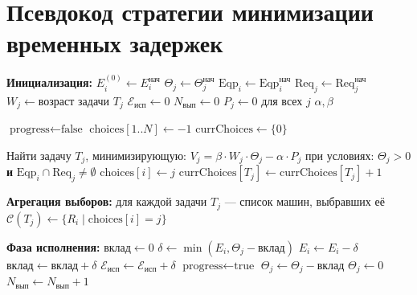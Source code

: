 \section{Псевдокод стратегии минимизации временных задержек}\label{app:pseudo_2}

\begin{breakablealgorithm}
	\label{pscode:z}
	\caption{Псевдокод стратегии $\Gamma_{\min\text{З}}$}
	\begin{algorithmic}[1]
		\State \textbf{Инициализация:}
		\State \quad $E_i^{(0)} \gets E_i^{\text{нач}}$ 
		\State \quad $\Theta_j \gets \Theta_j^{\text{нач}}$ 
		\State \quad $\text{Eqp}_i \gets \text{Eqp}_i^{\text{нач}}$ 
		\State \quad $\text{Req}_j \gets \text{Req}_j^{\text{нач}}$ 
		\State \quad $W_j \gets \text{возраст задачи } T_j$ 
		\State \quad $\mathcal{E}_{\text{исп}} \gets 0$ 
		\State \quad $N_{\text{вып}} \gets 0$ 
		\State \quad $P_j \gets 0$ для всех $j$ 
		\State \quad $\alpha, \beta$ 

		\State \quad $\text{progress} \gets \text{false}$
		\State \quad $\text{choices}[1..N] \gets -1$ 
		\State \quad $\text{currChoices} \gets \{0\}$ 

		\State \quad Найти задачу $T_j$, минимизирующую:
		\State \quad \quad $V_j = \beta \cdot W_j \cdot \Theta_j - \alpha \cdot P_j$
		\State \quad при условиях: $\Theta_j > 0$ \textbf{и} $\text{Eqp}_i \cap \text{Req}_j \neq \emptyset$
		\State \quad $\text{choices}[i] \gets j$
		\State \quad $\text{currChoices}[T_j] \gets \text{currChoices}[T_j] + 1$
		\EndIf
		\EndIf
		\EndFor

		\State \quad \textbf{Агрегация выборов:} для каждой задачи $T_j$ — список машин, выбравших её
		\State \quad $\mathcal{C}(T_j) \gets \{ R_i \mid \text{choices}[i] = j \}$

		\State \quad \textbf{Фаза исполнения:}
		\State \quad $\text{вклад} \gets 0$
		\State \quad $\delta \gets \min(E_i, \Theta_j - \text{вклад})$
		\State \quad $E_i \gets E_i - \delta$
		\State \quad $\text{вклад} \gets \text{вклад} + \delta$
		\State \quad $\mathcal{E}_{\text{исп}} \gets \mathcal{E}_{\text{исп}} + \delta$
		\State \quad $\text{progress} \gets \text{true}$
		\EndIf
		\EndFor
		\State \quad $\Theta_j \gets \Theta_j - \text{вклад}$
		\State \quad $\Theta_j \gets 0$
		\State \quad $N_{\text{вып}} \gets N_{\text{вып}} + 1$
		\EndIf
		\EndFor


\end{algorithmic}
\end{breakablealgorithm}
